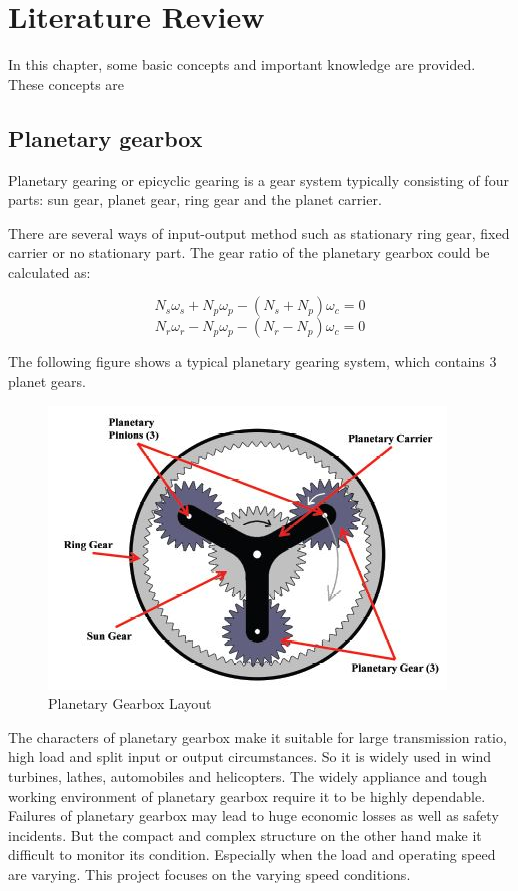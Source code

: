 \chapter{Literature Review}\label{ch:literature}

In this chapter, some basic concepts and important knowledge are provided. These concepts are 

\section{Planetary gearbox}

Planetary gearing or epicyclic gearing is a gear system typically consisting of four parts: sun gear, planet gear, ring gear and the planet carrier.

There are several ways of input-output method such as stationary ring gear, fixed carrier or no stationary part. The gear ratio of the planetary gearbox could be calculated as:

\begin{equation}
	N_s\omega_s + N_p\omega_p - (N_s + N_p)\omega_c = 0
\end{equation}
\begin{equation}
	N_r\omega_r - N_p\omega_p - (N_r - N_p)\omega_c = 0
\end{equation}

The following figure shows a typical planetary gearing system, which contains 3 planet gears.

\begin{figure}
	\centering
	\includegraphics{PGB}
	\caption{Planetary Gearbox Layout\cite{gearbox}}
	\label{simulationfigure}
\end{figure}

The characters of planetary gearbox make it suitable for large transmission ratio, high load and split input or output circumstances. So it is widely used in wind turbines, lathes, automobiles and helicopters. The widely appliance and tough working environment of planetary gearbox require it to be highly dependable. Failures of planetary gearbox may lead to huge economic losses as well as safety incidents. But the compact and complex structure on the other hand make it difficult to monitor its condition. Especially when the load and operating speed are varying. This project focuses on the varying speed conditions.




